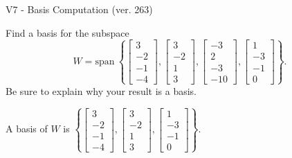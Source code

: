 \begin{exercise}
  \begin{exerciseTitle}V7 - Basis Computation (ver. 263)\end{exerciseTitle}
  \begin{exerciseStatement}
    Find a basis for the subspace 
\[W=\mathrm{span}\ \left\{\left[\begin{array}{r}
3 \\
-2 \\
-1 \\
-4
\end{array}\right] , \left[\begin{array}{r}
3 \\
-2 \\
1 \\
3
\end{array}\right] , \left[\begin{array}{r}
-3 \\
2 \\
-3 \\
-10
\end{array}\right] , \left[\begin{array}{r}
1 \\
-3 \\
-1 \\
0
\end{array}\right]\right\}.\]
 Be sure to explain why your result is a basis.


  \end{exerciseStatement}
  \begin{exerciseAnswer}
   A basis of \(W\) is  \(\left\{\left[\begin{array}{r}
3 \\
-2 \\
-1 \\
-4
\end{array}\right] , \left[\begin{array}{r}
3 \\
-2 \\
1 \\
3
\end{array}\right] , \left[\begin{array}{r}
1 \\
-3 \\
-1 \\
0
\end{array}\right]\right\}\).
  


  \end{exerciseAnswer}
\end{exercise}